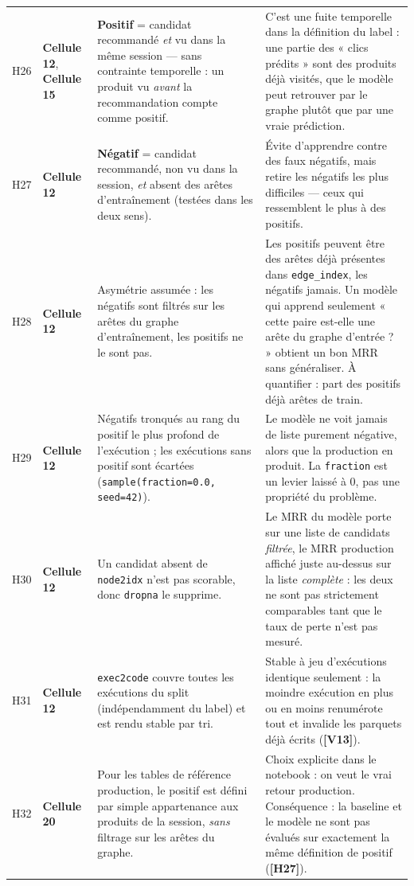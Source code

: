 \documentclass[11pt,a4paper]{article}
\newcommand{\code}[1]{\texttt{\small #1}}
\newcommand{\hyp}[1]{\textcolor{hypcol}{\textbf{\small [#1]}}}
\newcommand{\cell}[1]{\textbf{Cellule #1}}
\begin{document}
{\begin{longtable}{@{}l p{2.45cm} p{5.9cm} p{4.5cm}@{}}
\addlinespace
H26 & \cell{12}, \cell{15} & \textbf{Positif} = candidat recommandé \emph{et} vu dans la même session --- sans contrainte temporelle : un produit vu \emph{avant} la recommandation compte comme positif. & C'est une fuite temporelle dans la définition du label : une partie des « clics prédits » sont des produits déjà visités, que le modèle peut retrouver par le graphe plutôt que par une vraie prédiction. \\
\addlinespace
H27 & \cell{12} & \textbf{Négatif} = candidat recommandé, non vu dans la session, \emph{et} absent des arêtes d'entraînement (testées dans les deux sens). & Évite d'apprendre contre des faux négatifs, mais retire les négatifs les plus difficiles --- ceux qui ressemblent le plus à des positifs. \\
\addlinespace
H28 & \cell{12} & Asymétrie assumée : les négatifs sont filtrés sur les arêtes du graphe d'entraînement, les positifs ne le sont pas. & Les positifs peuvent être des arêtes déjà présentes dans \code{edge\_index}, les négatifs jamais. Un modèle qui apprend seulement « cette paire est-elle une arête du graphe d'entrée ? » obtient un bon MRR sans généraliser. À quantifier : part des positifs déjà arêtes de train. \\
\addlinespace
H29 & \cell{12} & Négatifs tronqués au rang du positif le plus profond de l'exécution ; les exécutions sans positif sont écartées (\code{sample(fraction=0.0, seed=42)}). & Le modèle ne voit jamais de liste purement négative, alors que la production en produit. La \code{fraction} est un levier laissé à 0, pas une propriété du problème. \\
\addlinespace
H30 & \cell{12} & Un candidat absent de \code{node2idx} n'est pas scorable, donc \code{dropna} le supprime. & Le MRR du modèle porte sur une liste de candidats \emph{filtrée}, le MRR production affiché juste au-dessus sur la liste \emph{complète} : les deux ne sont pas strictement comparables tant que le taux de perte n'est pas mesuré. \\
\addlinespace
H31 & \cell{12} & \code{exec2code} couvre toutes les exécutions du split (indépendamment du label) et est rendu stable par tri. & Stable à jeu d'exécutions identique seulement : la moindre exécution en plus ou en moins renumérote tout et invalide les parquets déjà écrits (\hyp{V13}). \\
\addlinespace
H32 & \cell{20} & Pour les tables de référence production, le positif est défini par simple appartenance aux produits de la session, \emph{sans} filtrage sur les arêtes du graphe. & Choix explicite dans le notebook : on veut le vrai retour production. Conséquence : la baseline et le modèle ne sont pas évalués sur exactement la même définition de positif (\hyp{H27}). \\

\end{longtable}}
\end{document}
